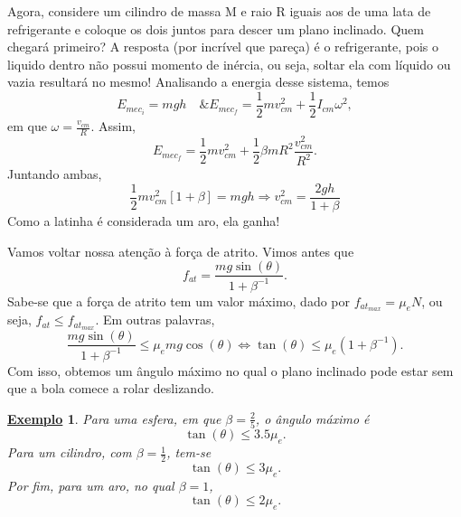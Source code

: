 \documentclass{article}
\newtheorem{example}{\underline{Exemplo}}
\begin{document}
  Agora, considere um cilindro de massa M e raio R iguais aos de uma lata de refrigerante e coloque os dois juntos para descer um plano inclinado. Quem chegará primeiro?
A resposta (por incrível que pareça) é o refrigerante, pois o liquido dentro não possui momento de inércia, ou seja, soltar ela com líquido ou vazia resultará no mesmo! Analisando a energia
desse sistema, temos 
  \[
    E_{mec_{i}} = mgh\quad \& E_{mec_{f}} = \frac{1}{2}mv_{cm}^{2} + \frac{1}{2}I_{cm}\omega^{2},
  \]
  em que \(\omega = \frac{v_{cm}}{R}\). Assim, 
    \[
      E_{mec_{f}}=\frac{1}{2}mv_{cm}^{2} + \frac{1}{2}\beta mR^{2}\frac{v_{cm}^{2}}{R^{2}}.
    \]
  Juntando ambas, 
    \[
      \frac{1}{2}mv_{cm}^{2}[1+\beta ] = mgh \Rightarrow v_{cm}^{2} = \frac{2gh}{1+\beta }
    \]
  Como a latinha é considerada um aro, ela ganha!

  Vamos voltar nossa atenção à força de atrito. Vimos antes que 
    \[
      f_{at} = \frac{mg\sin{(\theta )}}{1 + \beta^{-1}}.
    \]
  Sabe-se que a força de atrito tem um valor máximo, dado por \(f_{at_{max}} = \mu_{e}N\), ou seja,
 \(f_{at}\leq f_{at_{max}}\). Em outras palavras, 
   \[
     \frac{mg\sin{(\theta )}}{1+\beta^{-1}}\leq \mu_{e}mg\cos{(\theta )} \Longleftrightarrow \tan{(\theta )}\leq \mu_{e}(1+\beta^{-1}).
   \]
   Com isso, obtemos um ângulo máximo no qual o plano inclinado pode estar sem que a bola comece a rolar deslizando.
  \begin{example}
    Para uma esfera, em que \(\beta =\frac{2}{5}\), o ângulo máximo é 
      \[
        \tan{(\theta )}\leq 3.5\mu_{e}.
      \]
    Para um cilindro, com \(\beta = \frac{1}{2}\), tem-se 
      \[
        \tan{(\theta )}\leq 3\mu_{e}.
      \]
    Por fim, para um aro, no qual \(\beta =1\), 
      \[
        \tan{(\theta )}\leq 2\mu_{e}.
      \]
  \end{example}
\end{document}
